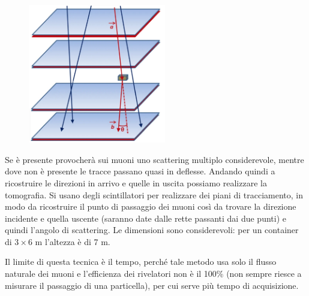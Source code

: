 \begin{minipage}{0.395\textwidth}
    \begin{figure}[H]
        \centering
        \includegraphics[width=6cm]{immagini/tomografia_muonica.png}
    \end{figure}
\end{minipage}
\begin{minipage}{0.6\textwidth}
    \vspace{0.5cm}Se è presente provocherà sui muoni uno scattering multiplo considerevole, mentre dove non è presente le tracce passano quasi in deflesse. Andando quindi a ricostruire le direzioni in arrivo e quelle in uscita possiamo realizzare la tomografia. Si usano degli scintillatori per realizzare dei piani di tracciamento, in modo da ricostruire il punto di passaggio dei muoni così da trovare la direzione incidente e quella uscente (saranno date dalle rette passanti dai due punti) e quindi l'angolo di scattering. Le dimensioni sono considerevoli: per un container di $3 \times 6$ m l'altezza è di 7 m.
\end{minipage}

\vspace{0.4cm}Il limite di questa tecnica è il tempo, perché tale metodo usa solo il flusso naturale dei muoni e l'efficienza dei rivelatori non è il 100\% (non sempre riesce a misurare il passaggio di una particella), per cui serve più tempo di acquisizione.